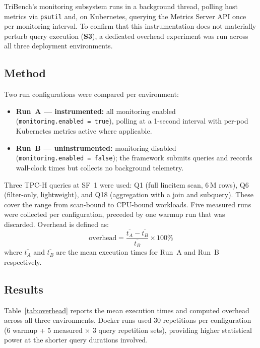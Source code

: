 \documentclass{l4proj}
\begin{document}
TriBench's monitoring subsystem runs in a background thread, polling host metrics via \texttt{psutil} and, on Kubernetes, querying the Metrics Server API once per monitoring interval. To confirm that this instrumentation does not materially perturb query execution (\textbf{S3}), a dedicated overhead experiment was run across all three deployment environments.

\subsection{Method}
\label{sec:eval_overhead_method}

Two run configurations were compared per environment:

\begin{itemize}
    \item \textbf{Run~A --- instrumented:} all monitoring enabled (\texttt{monitoring.enabled~=~true}), polling at a 1-second interval with per-pod Kubernetes metrics active where applicable.
    \item \textbf{Run~B --- uninstrumented:} monitoring disabled (\texttt{monitoring.enabled~=~false}); the framework submits queries and records wall-clock times but collects no background telemetry.
\end{itemize}

Three TPC-H queries at SF~1 were used: Q1 (full lineitem scan, 6\,M rows), Q6 (filter-only, lightweight), and Q18 (aggregation with a join and subquery). These cover the range from scan-bound to CPU-bound workloads. Five measured runs were collected per configuration, preceded by one warmup run that was discarded. Overhead is defined as:
\[
    \text{overhead} = \frac{\overline{t_A} - \overline{t_B}}{\overline{t_B}} \times 100\%
\]
where $\overline{t_A}$ and $\overline{t_B}$ are the mean execution times for Run~A and Run~B respectively.

\subsection{Results}
\label{sec:eval_overhead_results}

Table~\ref{tab:overhead} reports the mean execution times and computed overhead across all three environments. Docker runs used 30 repetitions per configuration (6 warmup + 5 measured × 3 query repetition sets), providing higher statistical power at the shorter query durations involved.
\end{document}
